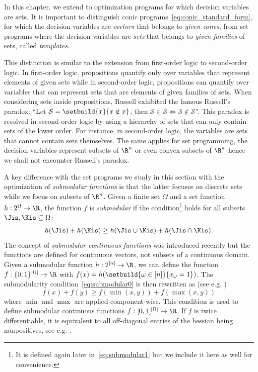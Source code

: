\documentclass[11pt,twoside,a4paper,openright]{uclouvain-thesis}
\begin{document}
In this chapter, we extend  to optimization programs for which
decision variables are sets.
It is important to distinguish conic programs~\eqref{eq:conic_standard_form}, for which the decision variables are \emph{vectors} that belongs to \emph{given cones},
from set programs where the decision variables are \emph{sets}
that belongs to \emph{given families} of sets, called \emph{templates}.

This distinction is similar to the extension from first-order logic to second-order logic.
In first-order logic, propositions quantify only over variables that represent
elements of given sets while in second-order logic, propositions can quantify
over variables that can represent sets that are elements of given families of sets.
When considering sets inside propositions, Russell exhibited the famous Russell's
paradox: ``Let $\mathcal{S} = \setbuild{x}{x \notin x}$, then $\mathcal{S} \in \mathcal{S} \Leftrightarrow \mathcal{S} \notin \mathcal{S}$''.
This paradox is resolved in second-order logic by using a hierarchy of sets that can only contain sets of the lower order.
For instance, in second-order logic, the variables are sets that cannot contain sets themselves.
The same applies for set programming, the decision variables represent subsets of $\R^n$
or even convex subsets of $\R^n$ hence we shall not encounter Russell's paradox.

A key difference with the set programs we study in this section with the optimization of \emph{submodular functions} is that
the latter focuses on discrete sets while we focus on subsets of $\R^n$.
Given a finite set $\Omega$ and a set function $h: 2^{\Omega} \to \R$,
the function $f$ is \emph{submodular} if the condition\footnote{It is defined again later in~\eqref{eq:submodular1} but we include it here as well for convenience.}
holds for all subsets $\Jis, \Kis \subseteq \Omega$:
\begin{equation}
  \label{eq:submodular0}
  h(\Jis) + h(\Kis) \geq h(\Jis \cup \Kis) + h(\Jis \cap \Kis).
\end{equation}
The concept of \emph{submodular continuous functions} was introduced recently
but the functions are defined for continuous vectors, not subsets of a continuous domain.
Given a submodular function $h: 2^{[n]} \to \R$, we can define the function
$f: \{0, 1\}^{|\Omega|} \to \R$ with $f(x) = h(\setbuild{\omega \in [n]}{x_\omega = 1})$.
The submodularity condition~\eqref{eq:submodular0} is then rewritten as (see e.g. \cite[(1)]{bach2019submodular})
\[ f(x) + f(y) \ge f(\min(x, y)) + f(\max(x, y)) \]
where $\min$ and $\max$ are applied component-wise.
This condition is used to define submodular continuous functions
$f: [0, 1]^{|\Omega|} \to \R$.
If $f$ is twice differentiable, it is equivalent to
all off-diagonal entries of the hessian being nonpositives, see e.g. \cite[(2)]{bian2016guaranteed}.
\end{document}
